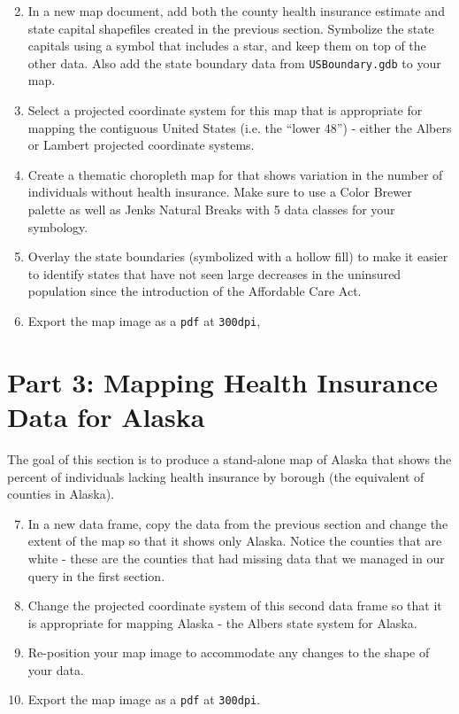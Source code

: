 \documentclass{tufte-handout}
\begin{document}
\begin{enumerate}
\setcounter{enumi}{1}
\item In a new map document, add both the county health insurance estimate and state capital shapefiles created in the previous section. Symbolize the state capitals using a symbol that includes a star, and keep them on top of the other data. Also add the state boundary data from \texttt{USBoundary.gdb} to your map.
\item Select a projected coordinate system for this map that is appropriate for mapping the contiguous United States (i.e. the ``lower 48'') - either the Albers or Lambert projected coordinate systems.
\item Create a thematic choropleth map for that shows variation in the number of individuals without health insurance. Make sure to use a Color Brewer palette as well as Jenks Natural Breaks with 5 data classes for your symbology.
\item Overlay the state boundaries (symbolized with a hollow fill) to make it easier to identify states that have not seen large decreases in the uninsured population since the introduction of the Affordable Care Act.
\item Export the map image as a \texttt{pdf} at \texttt{300dpi},
\end{enumerate}

\vspace{5mm}
\section{Part 3: Mapping Health Insurance Data for Alaska}
The goal of this section is to produce a stand-alone map of Alaska that shows the percent of individuals lacking health insurance by borough (the equivalent of counties in Alaska).

\begin{enumerate}
\setcounter{enumi}{6}
\item In a new data frame, copy the data from the previous section and change the extent of the map so that it shows only Alaska. Notice the counties that are white - these are the counties that had missing data that we managed in our query in the first section.
\item Change the projected coordinate system of this second data frame so that it is appropriate for mapping Alaska - the Albers state system for Alaska.
\item Re-position your map image to accommodate any changes to the shape of your data.
\item Export the map image as a \texttt{pdf} at \texttt{300dpi}.
\end{enumerate}
\end{document}
